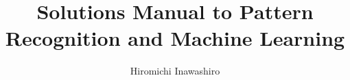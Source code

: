 \documentclass[12pt]{article}
\title{Solutions Manual to Pattern Recognition and Machine Learning}
\author{Hiromichi Inawashiro}
\date{}
\begin{document}
\maketitle{}

\newpage{}


\end{document}
